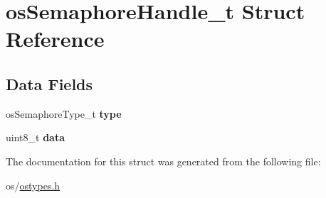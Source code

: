 \hypertarget{structos_semaphore_handle__t}{}\section{os\+Semaphore\+Handle\+\_\+t Struct Reference}
\label{structos_semaphore_handle__t}
\subsection*{Data Fields}
\begin{DoxyCompactItemize}
\item 
\mbox{\label{structos_semaphore_handle__t_a5a84f06656d71ab4080d24ca01c6507f}} 
os\+Semaphore\+Type\+\_\+t {\bfseries type}
\item 
\mbox{\label{structos_semaphore_handle__t_a325819a8e492ac69542e8b31705af6e9}} 
uint8\+\_\+t {\bfseries data}
\end{DoxyCompactItemize}


The documentation for this struct was generated from the following file\+:\begin{DoxyCompactItemize}
\item 
os/\hyperlink{ostypes_8h}{ostypes.\+h}\end{DoxyCompactItemize}
